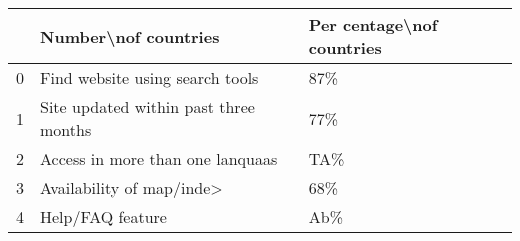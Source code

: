 \begin{tabular}{lll}
\toprule
{} &                   Number\textbackslash nof countries & Per centage\textbackslash nof countries \\
\midrule
0 &        Find website using search tools &                       87\% \\
1 &  Site updated within past three months &                       77\% \\
2 &       Access in more than one lanquaas &                       TA\% \\
3 &              Availability of map/inde> &                       68\% \\
4 &                       Help/FAQ feature &                       Ab\% \\
\bottomrule
\end{tabular}
